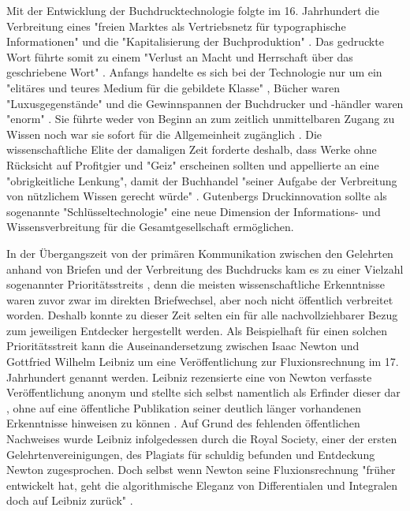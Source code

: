Mit der Entwicklung der Buchdrucktechnologie folgte im 16. Jahrhundert die Verbreitung eines "freien Marktes als Vertriebsnetz für typographische Informationen"\cite{giesecke_1991_buchdruck} und die "Kapitalisierung der Buchproduktion" \cite{steiner_1998_autorenhonorar}. Das gedruckte Wort führte somit zu einem "Verlust an Macht und Herrschaft über das geschriebene Wort" \cite{wunderlich_2008_buchdruck}. Anfangs handelte es sich bei der Technologie nur um ein "elitäres und teures Medium für die gebildete Klasse" \cite{hartmann_2008_medien}, Bücher waren "Luxusgegenstände" und die Gewinnspannen der Buchdrucker und -händler waren "enorm" \cite{stober_2014_pressegeschichte}. Sie führte weder von Beginn an zum zeitlich unmittelbaren Zugang zu Wissen noch war sie sofort für die Allgemeinheit zugänglich \cite{hartmann_2008_medien}. Die wissenschaftliche Elite der damaligen Zeit forderte deshalb, dass Werke ohne Rücksicht auf Profitgier und "Geiz" \cite{luther_1876} erscheinen sollten und appellierte an eine "obrigkeitliche Lenkung", damit der Buchhandel "seiner Aufgabe der Verbreitung von nützlichem Wissen gerecht würde" \cite{wittmann_1999_geschichte}. Gutenbergs Druckinnovation sollte als sogenannte "Schlüsseltechnologie" \cite{jager_1993_theoretische} eine neue Dimension der Informations- und Wissensverbreitung für die Gesamtgesellschaft ermöglichen.

In der Übergangszeit von der primären Kommunikation zwischen den Gelehrten anhand von Briefen und der Verbreitung des Buchdrucks kam es zu einer Vielzahl sogenannter Prioritätsstreits \cite{schirmbacher_2009_wisspub}, denn die meisten wissenschaftliche Erkenntnisse waren zuvor zwar im direkten Briefwechsel, aber noch nicht öffentlich verbreitet worden. Deshalb konnte zu dieser Zeit selten ein für alle nachvollziehbarer Bezug zum jeweiligen Entdecker hergestellt werden. Als Beispielhaft für einen solchen Prioritätsstreit kann die Auseinandersetzung zwischen Isaac Newton und Gottfried Wilhelm Leibniz um eine Veröffentlichung zur Fluxionsrechnung im 17. Jahrhundert genannt werden. Leibniz rezensierte eine von Newton verfasste Veröffentlichung anonym und stellte sich selbst namentlich als Erfinder dieser dar \cite{2013_leibniz}, ohne auf eine öffentliche Publikation seiner deutlich länger vorhandenen Erkenntnisse hinweisen zu können \cite{schirmbacher_2009_wisspub}. Auf Grund des fehlenden öffentlichen Nachweises wurde Leibniz infolgedessen durch die Royal Society, einer der ersten Gelehrtenvereinigungen, des Plagiats für schuldig befunden und Entdeckung Newton zugesprochen. Doch selbst wenn Newton seine Fluxionsrechnung "früher entwickelt hat, geht die algorithmische Eleganz von Differentialen und Integralen doch auf Leibniz zurück" \cite{kittler_faz_1996}.

